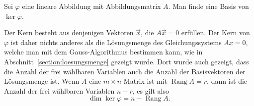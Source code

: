 \begin{aufgabe}
Sei $\varphi$ eine lineare Abbildung mit Abbildungsmatrix $A$.
Man finde eine Basis von $\ker\varphi$.
\end{aufgabe}

Der Kern besteht aus denjenigen Vektoren $\vec{x}$, die $A\vec{x}=0$
erfüllen.
Der Kern von $\varphi$ ist daher nichts anderes als die Lösungsmenge
des Gleichungssystems $Ax=0$, welche man mit dem Gauss-Algorithmus
bestimmen kann, wie in Abschnitt~\ref{section:loesungsmenge} gezeigt
wurde.
Dort wurde auch gezeigt, dass die Anzahl der frei wählbaren Variablen
auch die Anzahl der Basisvektoren der Lösungsmenge ist.
Wenn $A$ eine $m\times n$-Matrix ist mit $\operatorname{Rang}A=r$,
dann ist die Anzahl der frei wählbaren Variablen $n-r$, es gilt
also
\[
\dim\ker \varphi = n -\operatorname{Rang}A.
\]

